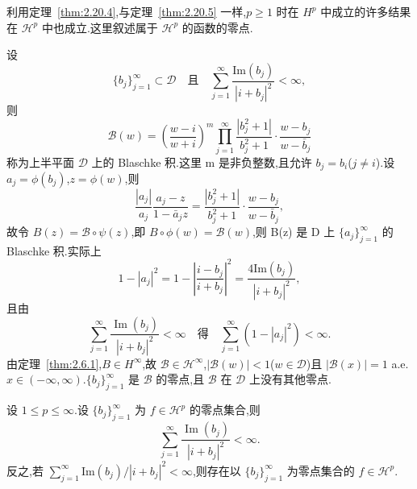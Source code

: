 利用定理~\ref{thm:2.20.4},与定理~\ref{thm:2.20.5} 一样,$p \geq 1$ 时在 $H^{p}$ 中成立的许多结果在 $\mathcal{H}^{p}$ 中也成立.这里叙述属于 $\mathcal{H}^{p}$ 的函数的零点.

设
\begin{equation*}
\{b_{j}\}_{j=1}^{\infty} \subset \mathcal{D} \quad \text{且} \quad \sum_{j=1}^{\infty}\frac{\mathrm{Im}(b_{j})}{|i + b_{j}|^{2}} < \infty,
\end{equation*}
则
\begin{equation*}
\mathcal{B}(w) = \left(\frac{w - i}{w + i}\right)^{m}\prod_{j=1}^{\infty}\frac{|b_{j}^{2} + 1|}{b_{j}^{2} + 1}\cdot\frac{w - b_{j}}{w - \bar{b}_{j}}
\end{equation*}
称为上半平面 $\mathcal{D}$ 上的 Blaschke 积.这里 m 是非负整数,且允许 $b_{j} = b_{i}$($j \neq i$).设 $a_{j} = \phi(b_{j})$,$z = \phi(w)$,则
\begin{equation*}
\frac{|a_{j}|}{a_{j}}\frac{a_{j} - z}{1 - \bar{a}_{j}z} = \frac{|b_{j}^{2} + 1|}{b_{j}^{2} + 1}\cdot\frac{w - b_{j}}{w - \bar{b}_{j}},
\end{equation*}
故令 $B(z) = \mathcal{B} \circ \psi(z)$,即 $B \circ \phi(w) = \mathcal{B}(w)$,则 B(z) 是 D 上 $\{a_{j}\}_{j=1}^{\infty}$ 的 Blaschke 积.实际上
\begin{equation*}
1 - |a_{j}|^{2} = 1 - \left| \frac{i - b_{j}}{i + b_{j}} \right|^{2} = \frac{4\mathrm{Im}(b_{j})}{|i + b_{j}|^{2}},
\end{equation*}
且由
\begin{equation*}
\sum_{j=1}^{\infty}\frac{\operatorname{Im}(b_{j})}{|i + b_{j}|^{2}} < \infty \quad \text{得} \quad \sum_{j=1}^{\infty}(1 - |a_{j}|^{2}) < \infty.
\end{equation*}
由定理~\ref{thm:2.6.1},$B \in H^{\infty}$,故 $\mathcal{B} \in \mathcal{H}^{\infty}$,$|\mathcal{B}(w)| < 1$($w \in \mathcal{D}$)且 $|\mathcal{B}(x)| = 1$ a.e. $x \in (-\infty, \infty)$.$\{b_{j}\}_{j=1}^{\infty}$ 是 $\mathcal{B}$ 的零点,且 $\mathcal{B}$ 在 $\mathcal{D}$ 上没有其他零点.

\begin{theorem}\label{thm:2.20.6}
设 $1 \leq p \leq \infty$.设 $\{b_{j}\}_{j=1}^{\infty}$ 为 $f \in \mathcal{H}^{p}$ 的零点集合,则
\begin{equation*}
\sum_{j=1}^{\infty}\frac{\operatorname{Im}(b_{j})}{|i + b_{j}|^{2}} < \infty.
\end{equation*}
反之,若 $\sum_{j=1}^{\infty}\mathrm{Im}(b_{j})/|i + b_{j}|^{2} < \infty$,则存在以 $\{b_{j}\}_{j=1}^{\infty}$ 为零点集合的 $f \in \mathcal{H}^{p}$.
\end{theorem}


